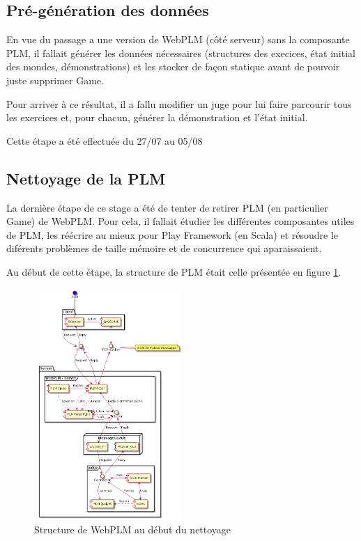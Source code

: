 \documentclass[stage]{tnreport}
\begin{document}
\subsection{Pré-génération des données}

En vue du passage a une version de WebPLM (côté serveur) sans la composante PLM, il fallait générer les données nécessaires (structures des execices, état initial des mondes, démonstrations) et les stocker de façon statique avant de pouvoir juste supprimer Game.

Pour arriver à ce résultat, il a fallu modifier un juge pour lui faire parcourir tous les exercices et, pour chacun, générer la démonstration et l'état initial.

Cette étape a été effectuée du 27/07 au 05/08

\subsection{Nettoyage de la PLM}

La dernière étape de ce stage a été de tenter de retirer PLM (en particulier Game) de WebPLM. Pour cela, il fallait étudier les différentes composantes utiles de PLM, les réécrire au mieux pour Play Framework (en Scala) et résoudre le diférents problèmes de taille mémoire et de concurrence qui aparaissaient.

Au début de cette étape, la structure de PLM était celle présentée en figure \ref{fig:wplmUP3}.
\begin{figure}[h!]
	\centering
		\includegraphics[width=0.5\textwidth]{figures/WebPLM-uml-cp3}
	\caption{Structure de WebPLM au début du nettoyage}
	\label{fig:wplmUP3}
\end{figure}
\end{document}
